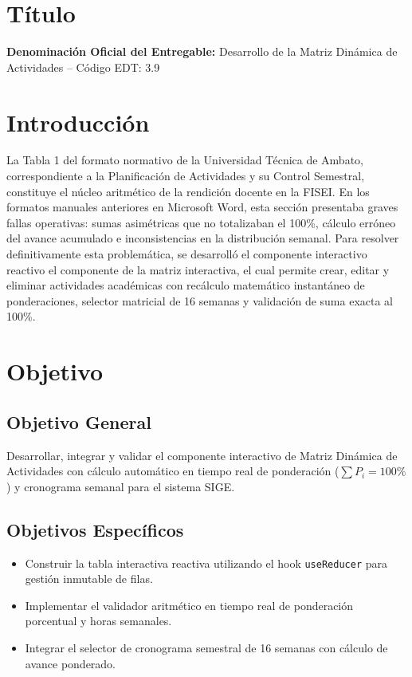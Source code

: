 \documentclass[12pt,a4paper]{article}
\begin{document}
\section{Título}
\textbf{Denominación Oficial del Entregable:} Desarrollo de la Matriz Dinámica de Actividades -- Código EDT: 3.9

\section{Introducción}
La Tabla 1 del formato normativo de la Universidad Técnica de Ambato, correspondiente a la Planificación de Actividades y su Control Semestral, constituye el núcleo aritmético de la rendición docente en la FISEI. En los formatos manuales anteriores en Microsoft Word, esta sección presentaba graves fallas operativas: sumas asimétricas que no totalizaban el 100\%, cálculo erróneo del avance acumulado e inconsistencias en la distribución semanal. Para resolver definitivamente esta problemática, se desarrolló el componente interactivo reactivo el componente de la matriz interactiva, el cual permite crear, editar y eliminar actividades académicas con recálculo matemático instantáneo de ponderaciones, selector matricial de 16 semanas y validación de suma exacta al 100\%.

\section{Objetivo}
\subsection{Objetivo General}
Desarrollar, integrar y validar el componente interactivo de Matriz Dinámica de Actividades con cálculo automático en tiempo real de ponderación ($\sum P_i = 100\%$) y cronograma semanal para el sistema SIGE.
\subsection{Objetivos Específicos}
\begin{itemize}[leftmargin=1.5em, itemsep=2pt]
    \item Construir la tabla interactiva reactiva utilizando el hook \texttt{useReducer} para gestión inmutable de filas.
    \item Implementar el validador aritmético en tiempo real de ponderación porcentual y horas semanales.
    \item Integrar el selector de cronograma semestral de 16 semanas con cálculo de avance ponderado.
\end{itemize}
\end{document}
